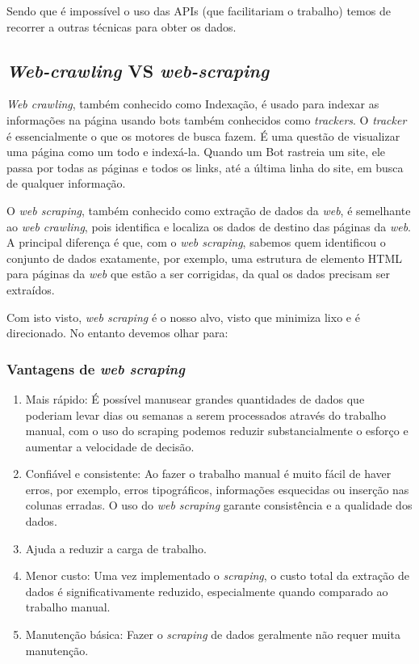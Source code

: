 \documentclass[a4paper,10pt]{article}
\begin{document}
Sendo que é impossível o uso das APIs (que facilitariam o trabalho) temos de recorrer a outras técnicas para obter os dados.

\subsection{\textit{Web-crawling} VS \textit{web-scraping}}

\textit{Web crawling}, também conhecido como Indexação, é usado para indexar as informações na página usando bots também conhecidos como \textit{trackers}.
O \textit{tracker} é essencialmente o que os motores de busca fazem.
É uma questão de visualizar uma página como um todo e indexá-la.
Quando um Bot rastreia um site, ele passa por todas as páginas e todos os links, até a última linha do site, em busca de qualquer informação.

O \textit{web scraping}, também conhecido como extração de dados da \textit{web}, é semelhante ao \textit{web crawling}, pois identifica e localiza os dados de destino das páginas da \textit{web}.
A principal diferença é que, com o \textit{web scraping}, sabemos quem identificou o conjunto de dados exatamente, por exemplo, uma estrutura de elemento HTML para páginas da \textit{web} que estão a ser corrigidas, da qual os dados precisam ser extraídos.

Com isto visto, \textit{web scraping} é o nosso alvo, visto que minimiza lixo e é direcionado.
No entanto devemos olhar para:

\subsubsection{Vantagens de \textit{web scraping}}

\begin{enumerate}
  \item Mais rápido: É possível manusear grandes quantidades de dados que poderiam levar dias ou semanas a serem processados através do trabalho manual, com o uso do scraping podemos reduzir substancialmente o esforço e aumentar a velocidade de decisão.
  \item Confiável e consistente: Ao fazer o trabalho manual é muito fácil de haver erros, por exemplo, erros tipográficos, informações esquecidas ou inserção nas colunas erradas. O uso do \textit{web scraping} garante consistência e a qualidade dos dados.
  \item Ajuda a reduzir a carga de trabalho.
  \item Menor custo: Uma vez implementado o \textit{scraping}, o custo total da extração de dados é significativamente reduzido, especialmente quando comparado ao trabalho manual.
  \item Manutenção básica: Fazer o \textit{scraping} de dados geralmente não requer muita manutenção.
\end{enumerate}
\end{document}
